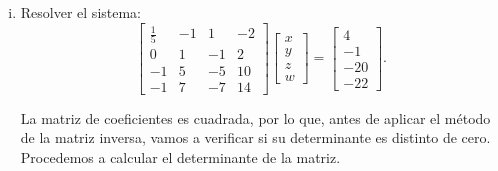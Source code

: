 \documentclass[11pt]{article}
\newcommand{\OptipoUno}[1]{\stackrel[#1]{}{=}}
\newcommand{\indicador}[4]{
{\tikz[remember picture,overlay]\coordinate (#1) at #2;}{\tikz[remember picture,overlay]\coordinate (#3) at #4;} 
}
\begin{document}
\begin{enumerate}[\hspace{-5mm} 1) ]
\begin{enumerate}[i) ]
 \hfill $\boxed{\rule{0mm}{5mm}{\bf Rta:}\quad  x=3,\ y= 1, \ z=0 \  }$







\bigskip 
\bigskip 
\bigskip 


    \item Resolver el sistema:
\[
\begin{bmatrix}
\tfrac{1}{5} & -1 & 1 & -2 \\
0 & 1 & -1 & 2 \\
-1 & 5 & -5 & 10 \\
-1 & 7 & -7 & 14
\end{bmatrix}
\begin{bmatrix}
x \\ y \\ z \\ w
\end{bmatrix}
=
\begin{bmatrix}
4 \\ -1 \\ -20 \\ -22
\end{bmatrix}.
\]



La matriz de coeficientes es cuadrada, por lo que, antes de aplicar el método de la matriz inversa, vamos a verificar si su determinante es distinto de cero. Procedemos a calcular el determinante de la matriz.

\medskip 

\end{enumerate}
\end{enumerate}
\end{document}

